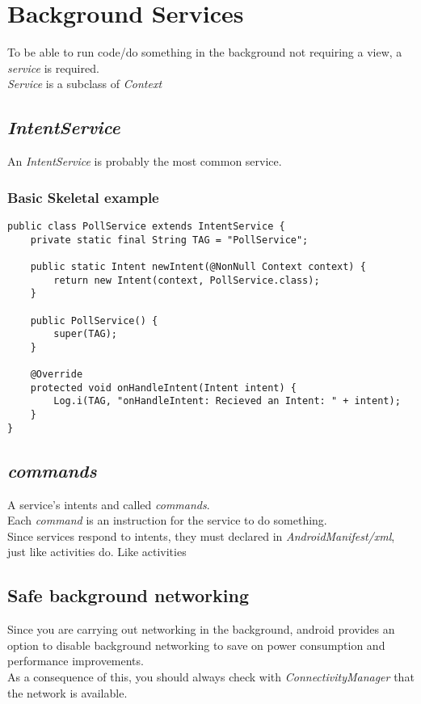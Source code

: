 \documentclass[]{article}
\renewcommand{\it}[1]{\textit{#1}}
\begin{document}
\section{Background Services}
To be able to run code/do something in the background not requiring a view, a \it{service} is required.
\\
\it{Service} is a subclass of \it{Context}
\subsection{\it{IntentService}}
An \it{IntentService} is probably the most common service.
\subsubsection{Basic Skeletal example}
\begin{lstlisting}
public class PollService extends IntentService {
	private static final String TAG = "PollService";
	
	public static Intent newIntent(@NonNull Context context) {
		return new Intent(context, PollService.class);
	}
	
	public PollService() {
		super(TAG);
	}
	
	@Override
	protected void onHandleIntent(Intent intent) {
		Log.i(TAG, "onHandleIntent: Recieved an Intent: " + intent);
	}
}
\end{lstlisting}

\subsection{\it{commands}}
A service's intents and called \it{commands}.  
\\
Each \it{command} is an instruction for the service to do something.
\\
Since services respond to intents, they must declared in \it{AndroidManifest/xml}, just like activities do.
Like activities

\subsection{Safe background networking}
Since you are carrying out networking in the background, android provides an option to disable background networking to save on power consumption and performance improvements.  
\\
As a consequence of this, you should always check with \it{ConnectivityManager} that the network is available.
\end{document}
